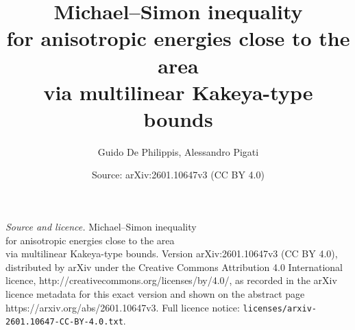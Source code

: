 \documentclass[10pt,a4paper]{amsart}
\title{Michael--Simon inequality \\ for anisotropic energies close to the area \\ via multilinear Kakeya-type bounds}
\author{Guido De Philippis, Alessandro Pigati}
\date{Source: arXiv:2601.10647v3 (CC BY 4.0)}
\begin{document}
\maketitle

\noindent\emph{Source and licence.} Michael--Simon inequality \\ for anisotropic energies close to the area \\ via multilinear Kakeya-type bounds. Version arXiv:2601.10647v3 (CC BY 4.0), distributed by arXiv under the Creative Commons Attribution 4.0 International licence, http://creativecommons.org/licenses/by/4.0/, as recorded in the arXiv licence metadata for this exact version and shown on the abstract page https://arxiv.org/abs/2601.10647v3. Full licence notice: \texttt{licenses/arxiv-2601.10647-CC-BY-4.0.txt}.\par\smallskip
\end{document}
